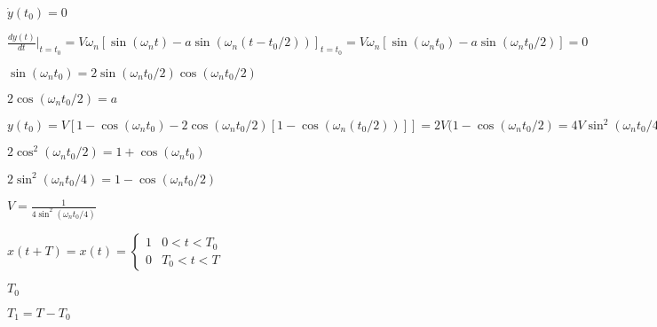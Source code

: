 \documentclass{article}
\def\lthtmlcheckvsize{\ifdim\ht\sizebox<\vsize 
  \ifdim\wd\sizebox<\hsize\expandafter\hfill\fi \expandafter\vfill
  \else\expandafter\vss\fi}%
\begin{document}
{\newpage\clearpage
{}%
$ \dot{y}(t_0)=0$%
\lthtmlindisplaymathZ
\lthtmlcheckvsize\clearpage}

{\newpage\clearpage
{}%
$\displaystyle \frac{dy(t)}{dt}\bigg|_{t=t_0}=V\omega_n\left[ \sin(\omega_nt)
-a\sin(\omega_n(t-t_0/2))\right]_{t=t_0}
=V\omega_n\left[ \sin(\omega_nt_0)-a\sin(\omega_nt_0/2)\right]=0$%
\lthtmlindisplaymathZ
\lthtmlcheckvsize\clearpage}

{\newpage\clearpage
{}%
$ \sin(\omega_nt_0)=2\sin(\omega_nt_0/2)\cos(\omega_nt_0/2)$%
\lthtmlindisplaymathZ
\lthtmlcheckvsize\clearpage}

{\newpage\clearpage
{}%
$\displaystyle 2\cos(\omega_nt_0/2) =a$%
\lthtmlindisplaymathZ
\lthtmlcheckvsize\clearpage}

{\newpage\clearpage
{}%
$\displaystyle y(t_0)=V\left[ 1-\cos(\omega_nt_0)-2\cos(\omega_nt_0/2)
[1-\cos(\omega_n(t_0/2))]\right]
=2V(1-\cos(\omega_nt_0/2) =4V\sin^2(\omega_nt_0/4)=1$%
\lthtmlindisplaymathZ
\lthtmlcheckvsize\clearpage}

{\newpage\clearpage
{}%
$ 2\cos^2(\omega_nt_0/2)=1+\cos(\omega_nt_0)$%
\lthtmlindisplaymathZ
\lthtmlcheckvsize\clearpage}

{\newpage\clearpage
{}%
$ 2\sin^2(\omega_nt_0/4)=1-\cos(\omega_nt_0/2)$%
\lthtmlindisplaymathZ
\lthtmlcheckvsize\clearpage}

{\newpage\clearpage
{}%
$\displaystyle V=\frac{1}{4\sin^2(\omega_nt_0/4)}$%
\lthtmlindisplaymathZ
\lthtmlcheckvsize\clearpage}

{\newpage\clearpage
{}%
$\displaystyle x(t+T)=x(t)=\left\{ \begin{array}{cl}1&0<t<T_0\\0&T_0<t<T\end{array}\right.$%
\lthtmlindisplaymathZ
\lthtmlcheckvsize\clearpage}

{\newpage\clearpage
{}%
$ T_0$%
\lthtmlindisplaymathZ
\lthtmlcheckvsize\clearpage}

{\newpage\clearpage
{}%
$ T_1=T-T_0$%
\lthtmlindisplaymathZ
\lthtmlcheckvsize\clearpage}
\end{document}
